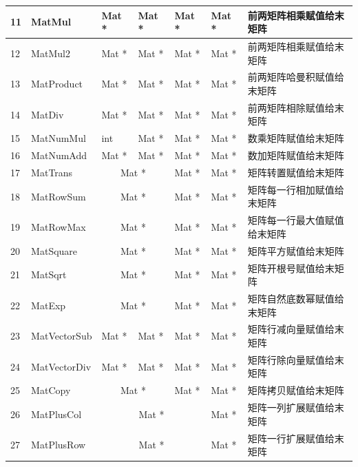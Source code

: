 \documentclass[UTF-8]{progbookcn}
\begin{document}
\begin{table}[!h]
{\begin{tabular}{|l|l|l|l|l|l|l|}
11 & MatMul       & \multicolumn{1}{l|}{Mat *} & Mat *         & Mat *        & Mat * & 前两矩阵相乘赋值给末矩阵    \\ \hline
12 & MatMul2      & \multicolumn{1}{l|}{Mat *} & Mat *         & Mat *        & Mat * & 前两矩阵相乘赋值给末矩阵  \\ \hline
13 & MatProduct   & \multicolumn{1}{l|}{Mat *} & Mat *         & Mat *        & Mat * & 前两矩阵哈曼积赋值给末矩阵   \\ \hline
14 & MatDiv       & \multicolumn{1}{l|}{Mat *} & Mat *         & Mat *        & Mat * & 前两矩阵相除赋值给末矩阵    \\ \hline
15 & MatNumMul    & \multicolumn{1}{l|}{int}   & Mat *         & Mat *        & Mat * & 数乘矩阵赋值给末矩阵     \\ \hline
16 & MatNumAdd    & \multicolumn{1}{l|}{Mat *} & Mat *         & Mat *        & Mat * & 数加矩阵赋值给末矩阵     \\ \hline
17 & MatTrans     & \multicolumn{2}{c|}{Mat *}                 & Mat *        & Mat * & 矩阵转置赋值给末矩阵     \\ \hline
18 & MatRowSum    & \multicolumn{2}{c|}{Mat *}                 & Mat *        & Mat * & 矩阵每一行相加赋值给末矩阵  \\ \hline
19 & MatRowMax    & \multicolumn{2}{c|}{Mat *}                 & Mat *        & Mat * & 矩阵每一行最大值赋值给末矩阵 \\ \hline
20 & MatSquare    & \multicolumn{2}{c|}{Mat *}                 & Mat *        & Mat * & 矩阵平方赋值给末矩阵     \\ \hline
21 & MatSqrt      & \multicolumn{2}{c|}{Mat *}                 & Mat *        & Mat * & 矩阵开根号赋值给末矩阵    \\ \hline
22 & MatExp       & \multicolumn{2}{c|}{Mat *}                 & Mat *        & Mat * & 矩阵自然底数幂赋值给末矩阵  \\ \hline
23 & MatVectorSub & \multicolumn{1}{l|}{Mat *} & Mat *         & Mat *        & Mat * & 矩阵行减向量赋值给末矩阵   \\ \hline
24 & MatVectorDiv & \multicolumn{1}{l|}{Mat *} & Mat *         & Mat *        & Mat * & 矩阵行除向量赋值给末矩阵   \\ \hline
25 & MatCopy      & \multicolumn{2}{c|}{Mat *}                 & Mat *        & Mat * & 矩阵拷贝赋值给末矩阵     \\ \hline
26 & MatPlusCol   & \multicolumn{3}{c|}{Mat *}                 & Mat * & 矩阵一列扩展赋值给末矩阵   \\ \hline
27   & MatPlusRow   & \multicolumn{3}{c|}{Mat *}               & Mat * & 矩阵一行扩展赋值给末矩阵   \\ \hline
\end{tabular}}
\end{table}
\end{document}
